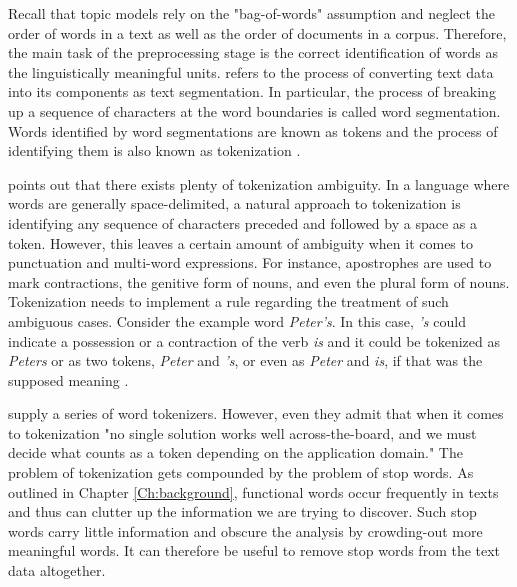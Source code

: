 \documentclass[11pt,a4paper,english,oneside]{book}
\numberwithin{equation}{chapter}
\begin{document}
Recall that topic models rely on the "bag-of-words" assumption and neglect the order of words in a text as well as the order of documents in a corpus. Therefore, the main task of the preprocessing stage is the correct identification of words as the linguistically meaningful units. \citet[p. 10]{Palmer.2010} refers to the process of converting text data into its components as text segmentation. In particular, the process of breaking up a sequence of characters at the word boundaries is called word segmentation. Words identified by word segmentations are known as tokens and the process of identifying them is also known as tokenization \citep[p. 10]{Palmer.2010}.

\citet[pp. 16-19]{Palmer.2010} points out that there exists plenty of tokenization ambiguity. In a language where words are generally space-delimited, a natural approach to tokenization is identifying any sequence of characters preceded and followed by a space as a token. However, this leaves a certain amount of ambiguity when it comes to punctuation and multi-word expressions. For instance, apostrophes are used to mark contractions, the genitive form of nouns, and even the plural form of nouns. Tokenization needs to implement a rule regarding the treatment of such ambiguous cases. Consider the example word \textit{Peter's}. In this case, \textit{'s} could indicate a possession or a contraction of the verb \textit{is} and it could be tokenized as \textit{Peters} or as two tokens, \textit{Peter} and \textit{'s}, or even as \textit{Peter} and \textit{is}, if that was the supposed meaning \cite[pp. 16-19]{Palmer.2010}.

\cite{Bird.2010} supply a series of word tokenizers. However, even they admit that when it comes to tokenization "no single solution works well across-the-board, and we must decide what counts as a token depending on the application domain." The problem of tokenization gets compounded by the problem of stop words. As outlined in Chapter \ref{Ch:background}, functional words occur frequently in texts and thus can clutter up the information we are trying to discover. Such stop words carry little information and obscure the analysis by crowding-out more meaningful words. It can therefore be useful to remove stop words from the text data altogether. 
\end{document}
